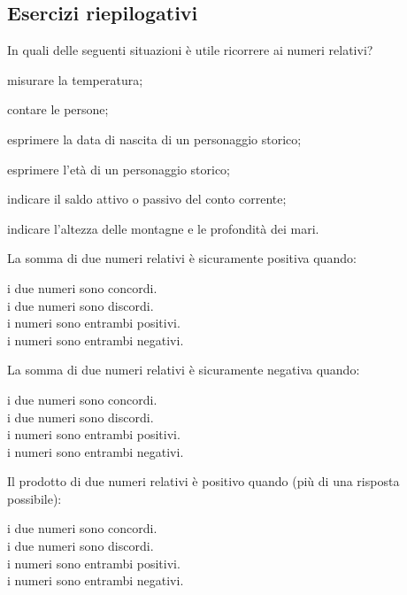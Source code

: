 \subsection{Esercizi riepilogativi}

\begin{esercizio}
In quali delle seguenti situazioni è utile ricorrere ai numeri relativi?
 \begin{enumeratees}
 \item misurare la temperatura;
 \item contare le persone;
 \item esprimere la data di nascita di un personaggio storico;
 \item esprimere l'età di un personaggio storico;
 \item indicare il saldo attivo o passivo del conto corrente;
 \item indicare l'altezza delle montagne e le profondità dei mari.
 \end{enumeratees}
\end{esercizio}

\begin{esercizio}
La somma di due numeri relativi è sicuramente positiva quando:
 \begin{htmulticols}{2}
 \noindent
  \quad i due numeri sono concordi.\\
  \quad i due numeri sono discordi.\\
  \quad i numeri sono entrambi positivi.\\
  \quad i numeri sono entrambi negativi.
 \end{htmulticols}
\end{esercizio}

\begin{esercizio}
La somma di due numeri relativi è sicuramente negativa quando:
 \begin{htmulticols}{2}
 \noindent
  \quad i due numeri sono concordi.\\
  \quad i due numeri sono discordi.\\
  \quad i numeri sono entrambi positivi.\\
  \quad i numeri sono entrambi negativi.
 \end{htmulticols}
\end{esercizio}

\begin{esercizio}
Il prodotto di due numeri relativi è positivo quando (più di una risposta 
possibile):
 \begin{htmulticols}{2}
 \noindent
  \quad i due numeri sono concordi.\\
  \quad i due numeri sono discordi.\\
  \quad i numeri sono entrambi positivi.\\
  \quad i numeri sono entrambi negativi.
 \end{htmulticols}
\end{esercizio}

